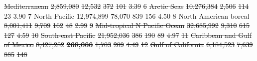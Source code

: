 \documentclass[12pt,authoryear]{elsarticle}
\providecommand{\DIFdeltex}[1]{{\protect\color{red}\sout{#1}}}                      %
\providecommand{\DIFdelFL}[1]{\DIFdel{#1}} %
\providecommand{\DIFdel}[1]{\texorpdfstring{\DIFdeltex{#1}}{}} %
\begin{document}
\begin{table}[]
\DIFdelFL{Mediterranean                       }%
\DIFdelFL{2,859,080 }%
\DIFdelFL{12,532 }%
\DIFdelFL{372 }%
\DIFdelFL{101 }%
\DIFdelFL{3.39 }%
\DIFdelFL{6  }%
\DIFdelFL{Arctic Seas                         }%
\DIFdelFL{10,276,384 }%
\DIFdelFL{2,506 }%
\DIFdelFL{114 }%
\DIFdelFL{23 }%
\DIFdelFL{3.90 }%
\DIFdelFL{7  }%
\DIFdelFL{North Pacific                       }%
\DIFdelFL{12,974,899 }%
\DIFdelFL{78,070 }%
\DIFdelFL{839 }%
\DIFdelFL{156 }%
\DIFdelFL{4.50 }%
\DIFdelFL{8  }%
\DIFdelFL{North American boreal               }%
\DIFdelFL{8,001,411 }%
\DIFdelFL{9,709 }%
\DIFdelFL{162 }%
\DIFdelFL{48 }%
\DIFdelFL{2.99 }%
\DIFdelFL{9  }%
\DIFdelFL{Mid-tropical N Pacific Ocean        }%
\DIFdelFL{32,685,992 }%
\DIFdelFL{9,310 }%
\DIFdelFL{615 }%
\DIFdelFL{127 }%
\DIFdelFL{4.59 }%
\DIFdelFL{10 }%
\DIFdelFL{South-east Pacific                  }%
\DIFdelFL{21,952,036 }%
\DIFdelFL{386 }%
\DIFdelFL{190 }%
\DIFdelFL{89 }%
\DIFdelFL{4.97 }%
\DIFdelFL{11 }%
\DIFdelFL{Caribbean and Gulf of Mexico        }%
\DIFdelFL{8,427,282 }%
\textbf{\DIFdelFL{268,066}} %
\DIFdelFL{1,703 }%
\DIFdelFL{209 }%
\DIFdelFL{4.49 }%
\DIFdelFL{12 }%
\DIFdelFL{Gulf of California                  }%
\DIFdelFL{6,184,523 }%
\DIFdelFL{7,639 }%
\DIFdelFL{885 }%
\DIFdelFL{148 }%

\end{table}
\end{document}
